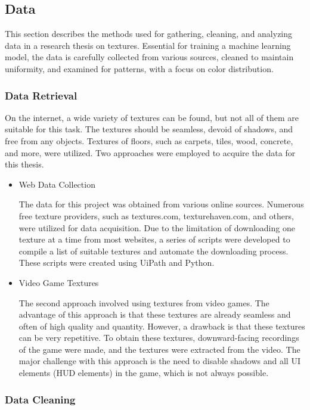 \subsection{Data}
    
This section describes the methods used for gathering, cleaning, and analyzing data in a research thesis on textures. Essential for training a machine learning model, the data is carefully collected from various sources, cleaned to maintain uniformity, and examined for patterns, with a focus on color distribution.


\subsubsection{Data Retrieval}
On the internet, a wide variety of textures can be found, but not all of them are suitable for this task. The textures should be seamless, devoid of shadows, and free from any objects. Textures of floors, such as carpets, tiles, wood, concrete, and more, were utilized. Two approaches were employed to acquire the data for this thesis.

\begin{itemize}
    \item Web Data Collection

    The data for this project was obtained from various online sources. Numerous free texture providers, such as textures.com, texturehaven.com, and others, were utilized for data acquisition. Due to the limitation of downloading one texture at a time from most websites, a series of scripts were developed to compile a list of suitable textures and automate the downloading process. These scripts were created using UiPath and Python.
    
    \item Video Game Textures
    
    The second approach involved using textures from video games. The advantage of this approach is that these textures are already seamless and often of high quality and quantity. However, a drawback is that these textures can be very repetitive. To obtain these textures, downward-facing recordings of the game were made, and the textures were extracted from the video. The major challenge with this approach is the need to disable shadows and all UI elements (HUD elements) in the game, which is not always possible.
\end{itemize}

\subsubsection{Data Cleaning}

